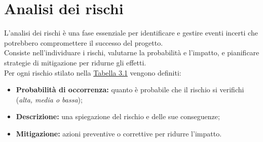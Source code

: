 \pagebreak
\section{Analisi dei rischi}
\label{sez:analisi-dei-rischi}

L'analisi dei rischi è una fase essenziale per identificare e gestire eventi incerti che potrebbero compromettere il successo del progetto. \\
Consiste nell’individuare i rischi, valutarne la probabilità e l’impatto, e pianificare strategie di mitigazione per ridurne gli effetti.\\

\noindent Per ogni rischio stilato nella {\hyperref[tab:analisi-rischi]{Tabella 3.1}} vengono definiti:

\begin{itemize}
    \item \textbf{Probabilità di occorrenza:} quanto è probabile che il rischio si verifichi (\textit{alta, media o bassa});
    \item \textbf{Descrizione:} una spiegazione del rischio e delle sue conseguenze;
    \item \textbf{Mitigazione:} azioni preventive o correttive per ridurre l’impatto.
\end{itemize}

\renewcommand{\arraystretch}{1.5} %

